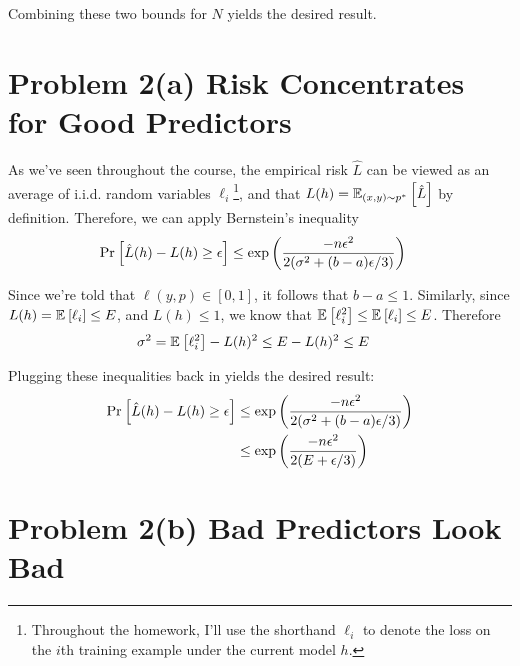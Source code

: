 \documentclass[11pt]{article}
\newcommand{\1}{\mathbb{I}} %
\begin{document}
Combining these two bounds for $N$ yields the desired result. 

\clearpage 
\section*{Problem 2(a) Risk Concentrates for Good Predictors}

As we've seen throughout the course, the empirical risk $\hat L$ can be viewed as an average of i.i.d. random variables $\ell_i$\footnote{Throughout the homework, I'll use the shorthand $\ell_i$ to denote the loss on the $i$th training example under the current model $h$.}, and that $L(h) = \E[(x,y) \sim p^*]{\hat L}$ by definition. Therefore, we can apply Bernstein's inequality
\begin{align}
	\Prob{ \hat{L}(h) - L(h) \geq \epsilon } 
		&\leq  \exp\lr{  \frac{-n \epsilon^2}{2 (\sigma^2 + (b -a ) \epsilon / 3 ) } }
\end{align}

Since we're told that $\ell(y, p) \in [0, 1]$, it follows that $b - a \leq 1$. Similarly, since $L(h) = \E{\ell_i} \leq E$, and $L(h) \leq 1$, we know that $\E{\ell_i^2} \leq \E{\ell_i} \leq E$. Therefore
\begin{align}
	\sigma^2 
		&= \E{\ell_i^2} - L(h)^2 
		\leq E - L(h)^2
		\leq E 
\end{align}

Plugging these inequalities back in yields the desired result:
\begin{align}
	\Prob{ \hat{L}(h) - L(h) \geq \epsilon } 
	 	&\leq \exp\lr{  \frac{-n \epsilon^2}{2 (\sigma^2 + (b -a ) \epsilon / 3 ) } } \\
	 	&\leq \exp\lr{  \frac{-n \epsilon^2}{2 (E  +  \epsilon / 3 ) } } 
\end{align}


\clearpage 
\section*{Problem 2(b) Bad Predictors Look Bad}
\end{document}
